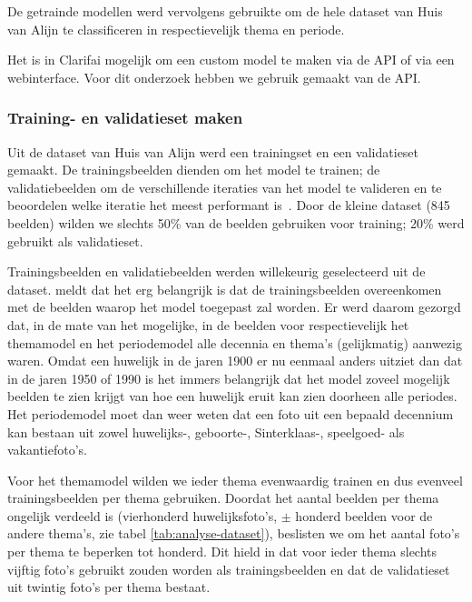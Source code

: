 De getrainde modellen werd vervolgens gebruikte om de hele dataset van Huis van Alijn te classificeren in respectievelijk thema en periode. 

Het is in Clarifai mogelijk om een custom model te maken via de API of via een webinterface. Voor dit onderzoek hebben we gebruik gemaakt van de API.

\subsubsection{Training- en validatieset maken}

Uit de dataset van Huis van Alijn werd een trainingset en een validatieset gemaakt. De trainingsbeelden dienden om het model te trainen; de validatiebeelden om de verschillende iteraties van het model te valideren en te beoordelen welke iteratie het meest performant is~\autocites{Lievens2017}{Brownlee2017}. Door de kleine dataset (845 beelden) wilden we slechts 50\% van de beelden gebruiken voor training; 20\% werd gebruikt als validatieset.


Trainingsbeelden en validatiebeelden werden willekeurig geselecteerd uit de dataset. \textcite{Gong2017} meldt dat het erg belangrijk is dat de trainingsbeelden overeenkomen met de beelden waarop het model toegepast zal worden. Er werd daarom gezorgd dat, in de mate van het mogelijke, in de beelden voor respectievelijk het themamodel en het periodemodel alle decennia en thema’s (gelijkmatig) aanwezig waren. Omdat een huwelijk in de jaren 1900 er nu eenmaal anders uitziet dan dat in de jaren 1950 of 1990 is het immers belangrijk dat het model zoveel mogelijk beelden te zien krijgt van hoe een huwelijk eruit kan zien doorheen alle periodes. Het periodemodel moet dan weer weten dat een foto uit een bepaald decennium kan bestaan uit zowel huwelijks-, geboorte-, Sinterklaas-, speelgoed- als vakantiefoto’s.

Voor het themamodel wilden we ieder thema evenwaardig trainen en dus evenveel trainingsbeelden per thema gebruiken. Doordat het aantal beelden per thema ongelijk verdeeld is (vierhonderd huwelijksfoto’s, $\pm$ honderd beelden voor de andere thema’s, zie tabel \ref{tab:analyse-dataset}), beslisten we om het aantal foto’s per thema te beperken tot honderd. Dit hield in dat voor ieder thema slechts vijftig foto’s gebruikt zouden worden als trainingsbeelden en dat de validatieset uit twintig foto’s per thema bestaat. 

